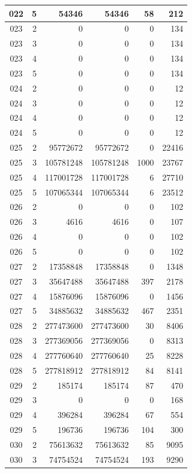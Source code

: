 \begin{longtable}{|c|r|r|r|r|r|}
022 & 5 & 54346 & 54346 & 58 & 212 \\
\hline
023 & 2 & 0 & 0 & 0 & 134 \\
\hline
023 & 3 & 0 & 0 & 0 & 134 \\
\hline
023 & 4 & 0 & 0 & 0 & 134 \\
\hline
023 & 5 & 0 & 0 & 0 & 134 \\
\hline
024 & 2 & 0 & 0 & 0 & 12 \\
\hline
024 & 3 & 0 & 0 & 0 & 12 \\
\hline
024 & 4 & 0 & 0 & 0 & 12 \\
\hline
024 & 5 & 0 & 0 & 0 & 12 \\
\hline
025 & 2 & 95772672 & 95772672 & 0 & 22416 \\
\hline
025 & 3 & 105781248 & 105781248 & 1000 & 23767 \\
\hline
025 & 4 & 117001728 & 117001728 & 6 & 27710 \\
\hline
025 & 5 & 107065344 & 107065344 & 6 & 23512 \\
\hline
026 & 2 & 0 & 0 & 0 & 102 \\
\hline
026 & 3 & 4616 & 4616 & 0 & 107 \\
\hline
026 & 4 & 0 & 0 & 0 & 102 \\
\hline
026 & 5 & 0 & 0 & 0 & 102 \\
\hline
027 & 2 & 17358848 & 17358848 & 0 & 1348 \\
\hline
027 & 3 & 35647488 & 35647488 & 397 & 2178 \\
\hline
027 & 4 & 15876096 & 15876096 & 0 & 1456 \\
\hline
027 & 5 & 34885632 & 34885632 & 467 & 2351 \\
\hline
028 & 2 & 277473600 & 277473600 & 30 & 8406 \\
\hline
028 & 3 & 277369056 & 277369056 & 0 & 8313 \\
\hline
028 & 4 & 277760640 & 277760640 & 25 & 8228 \\
\hline
028 & 5 & 277818912 & 277818912 & 84 & 8141 \\
\hline
029 & 2 & 185174 & 185174 & 87 & 470 \\
\hline
029 & 3 & 0 & 0 & 0 & 168 \\
\hline
029 & 4 & 396284 & 396284 & 67 & 554 \\
\hline
029 & 5 & 196736 & 196736 & 104 & 300 \\
\hline
030 & 2 & 75613632 & 75613632 & 85 & 9095 \\
\hline
030 & 3 & 74754524 & 74754524 & 193 & 9290 \\

\end{longtable}
